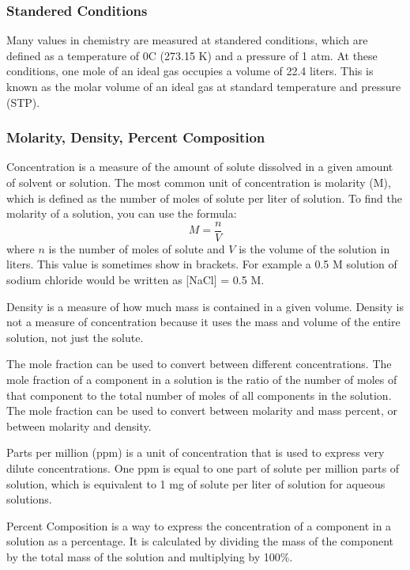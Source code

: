         \subsubsection{Standered Conditions}
        Many values in chemistry are measured at standered conditions, which are defined as a temperature of 0\textdegree C (273.15 K) and a pressure of 1 atm. At these conditions, one mole of an ideal gas occupies a volume of 22.4 liters. This is known as the molar volume of an ideal gas at standard temperature and pressure (STP).
        \subsubsection{Molarity, Density, Percent Composition}
        Concentration is a measure of the amount of solute dissolved in a given amount of solvent or solution. The most common unit of concentration is molarity (M), which is defined as the number of moles of solute per liter of solution. To find the molarity of a solution, you can use the formula:
        \begin{equation}\label{eq:molarity}
            M = \frac{n}{V}
        \end{equation}
        where $n$ is the number of moles of solute and $V$ is the volume of the solution in liters. This value is sometimes show in brackets. For example a 0.5 M solution of sodium chloride would be written as [NaCl] = 0.5 M.

        Density is a measure of how much mass is contained in a given volume. Density is not a measure of concentration because it uses the mass and volume of the entire solution, not just the solute. 

        The mole fraction can be used to convert between different concentrations. The mole fraction of a component in a solution is the ratio of the number of moles of that component to the total number of moles of all components in the solution. The mole fraction can be used to convert between molarity and mass percent, or between molarity and density.

        Parts per million (ppm) is a unit of concentration that is used to express very dilute concentrations. One ppm is equal to one part of solute per million parts of solution, which is equivalent to 1 mg of solute per liter of solution for aqueous solutions.

        Percent Composition is a way to express the concentration of a component in a solution as a percentage. It is calculated by dividing the mass of the component by the total mass of the solution and multiplying by 100\%.
